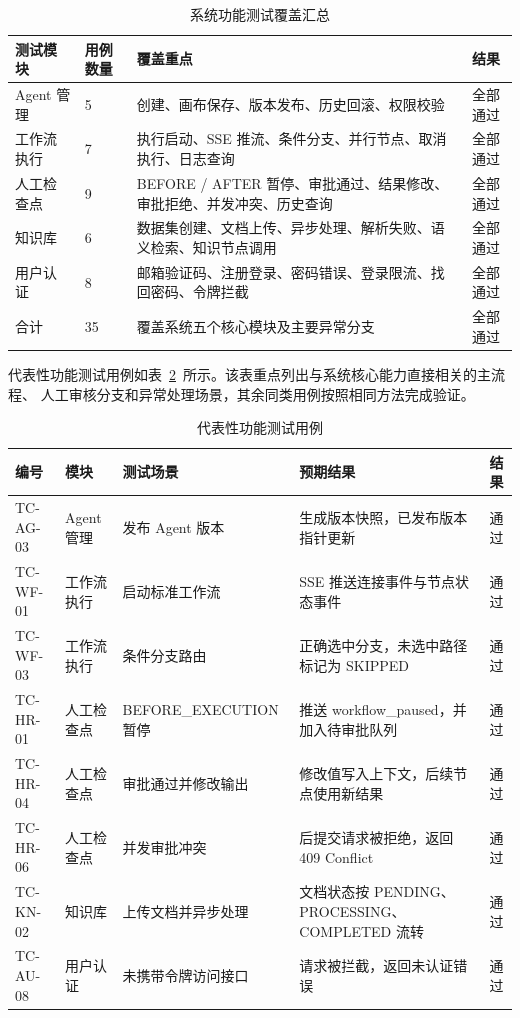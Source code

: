 \begin{table}[H]
  \centering
  \caption{系统功能测试覆盖汇总}
  \label{tab:func_test}
  \small
  \begin{tabular}{p{2.2cm}p{1.5cm}p{6.1cm}c}
    \toprule
    测试模块 & 用例数量 & 覆盖重点 & 结果 \\
    \midrule
    Agent 管理 & 5 & 创建、画布保存、版本发布、历史回滚、权限校验 & 全部通过 \\
    工作流执行 & 7 & 执行启动、SSE 推流、条件分支、并行节点、取消执行、日志查询 & 全部通过 \\
    人工检查点 & 9 & BEFORE / AFTER 暂停、审批通过、结果修改、审批拒绝、并发冲突、历史查询 & 全部通过 \\
    知识库 & 6 & 数据集创建、文档上传、异步处理、解析失败、语义检索、知识节点调用 & 全部通过 \\
    用户认证 & 8 & 邮箱验证码、注册登录、密码错误、登录限流、找回密码、令牌拦截 & 全部通过 \\
    \midrule
    合计 & 35 & 覆盖系统五个核心模块及主要异常分支 & 全部通过 \\
    \bottomrule
  \end{tabular}
\end{table}

代表性功能测试用例如表~\ref{tab:func_test_typical}~所示。该表重点列出与系统核心能力直接相关的主流程、
人工审核分支和异常处理场景，其余同类用例按照相同方法完成验证。

\begin{table}[H]
  \centering
  \caption{代表性功能测试用例}
  \label{tab:func_test_typical}
  \small
  \begin{tabular}{p{1.5cm}p{1.7cm}p{3.6cm}p{3.8cm}c}
    \toprule
    编号 & 模块 & 测试场景 & 预期结果 & 结果 \\
    \midrule
    TC-AG-03 & Agent 管理 & 发布 Agent 版本 & 生成版本快照，已发布版本指针更新 & 通过 \\
    TC-WF-01 & 工作流执行 & 启动标准工作流 & SSE 推送连接事件与节点状态事件 & 通过 \\
    TC-WF-03 & 工作流执行 & 条件分支路由 & 正确选中分支，未选中路径标记为 SKIPPED & 通过 \\
    TC-HR-01 & 人工检查点 & BEFORE\_\allowbreak EXECUTION 暂停 & 推送 workflow\_paused，并加入待审批队列 & 通过 \\
    TC-HR-04 & 人工检查点 & 审批通过并修改输出 & 修改值写入上下文，后续节点使用新结果 & 通过 \\
    TC-HR-06 & 人工检查点 & 并发审批冲突 & 后提交请求被拒绝，返回 409 Conflict & 通过 \\
    TC-KN-02 & 知识库 & 上传文档并异步处理 & 文档状态按 PENDING、PROCESSING、COMPLETED 流转 & 通过 \\
    TC-AU-08 & 用户认证 & 未携带令牌访问接口 & 请求被拦截，返回未认证错误 & 通过 \\
    \bottomrule
  \end{tabular}
\end{table}

